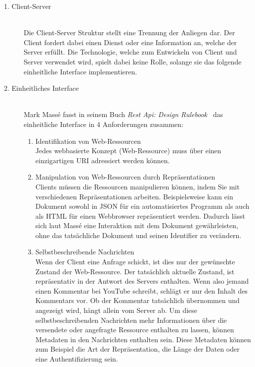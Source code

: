 \begin{description}

    \item[1. Client-Server]\hfill \\
    Die Client-Server Struktur stellt eine Trennung der Anliegen dar. Der Client
    fordert dabei einen Dienst oder eine Information an, welche der Server erfüllt.
    Die Technologie, welche zum Entwickeln von Client und Server verwendet wird,
    spielt dabei keine Rolle, solange sie das folgende einheitliche Interface implementieren.

    \item[2. Einheitliches Interface]\hfill \\
    Mark Massé fasst in seinem Buch \textit{Rest Api: Design Rulebook}~\cite{Mas11}
    das einheitliche Interface in 4 Anforderungen zusammen: 
    
    \begin{enumerate}
        \item Identifikation von Web-Ressourcen\hfill \\
        Jedes webbasierte Konzept (Web-Ressource) muss über einen einzigartigen 
        \gls{URI} adressiert werden können. 

        \item Manipulation von Web-Ressourcen durch Repräsentationen\hfill \\
        Clients müssen die Ressourcen manipulieren können, indem Sie mit verschiedenen
        Repräsentationen arbeiten. Beispielsweise kann ein Dokument sowohl in 
        \gls{JSON} für ein automatisiertes Programm als auch als \gls{HTML} für 
        einen Webbrowser repräsentiert werden. Dadurch lässt sich laut Massé eine
        Interaktion mit dem Dokument gewährleisten, ohne das tatsächliche Dokument
        und seinen Identifier zu verändern.

        \item Selbstbeschreibende Nachrichten\hfill \\
        Wenn der Client eine Anfrage schickt, ist dies nur der gewünschte Zustand
        der Web-Ressource. Der tatsächlich aktuelle Zustand, ist repräsentativ in 
        der Antwort des Servers enthalten. Wenn also jemand einen Kommentar bei 
        YouTube schreibt, schlägt er nur den Inhalt des Kommentars vor. Ob der 
        Kommentar tatsächlich übernommen und angezeigt wird, hängt allein vom 
        Server ab. 
        Um diese selbstbeschreibenden Nachrichten mehr Informationen über die 
        versendete oder angefragte Ressource enthalten zu lassen, können Metadaten
        in den Nachrichten enthalten sein. Diese Metadaten können zum Beispiel
        die Art der Repräsentation, die Länge der Daten oder eine Authentifizierung 
        sein.\\


\end{enumerate}
\end{description}
